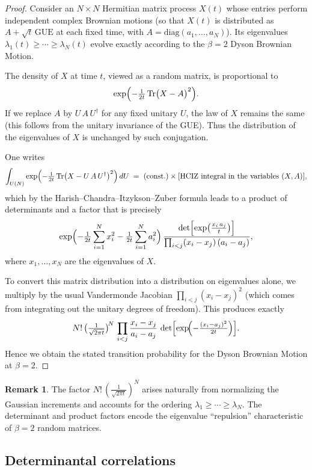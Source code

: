 \documentclass[letterpaper,11pt,oneside,reqno]{article}
\numberwithin{equation}{section}
\theoremstyle{definition}
\newtheorem{remark}[proposition]{Remark}
\begin{document}
\begin{proof}
Consider an \(N\times N\) Hermitian matrix process \(X(t)\) whose entries perform independent complex Brownian motions (so that \(X(t)\) is distributed as \(A + \sqrt{t}\,\mathrm{GUE}\) at each fixed time, with \(A=\mathrm{diag}(a_1,\dots,a_N)\)).  Its eigenvalues \(\lambda_1(t)\ge \cdots \ge \lambda_N(t)\) evolve exactly according to the \(\beta=2\) Dyson Brownian Motion.

The density of \(X\) at time \(t\), viewed as a random matrix, is proportional to
\[
\exp\Bigl(-\tfrac{1}{2t}\,\mathrm{Tr}\bigl(X-A\bigr)^2\Bigr).
\]
If we replace \(A\) by \(U\,A\,U^\dagger\) for any fixed unitary \(U\), the law of \(X\) remains the same (this follows from the unitary invariance of the GUE).  Thus the distribution of the eigenvalues of \(X\) is unchanged by such conjugation.

One writes
\[
\int_{U(N)} 
\exp\Bigl(-\tfrac{1}{2t}\,\mathrm{Tr}\bigl(X-U\,A\,U^\dagger\bigr)^2\Bigr)\,dU
\;=\;
\text{(const.)} \times 
\text{[HCIZ integral in the variables }(X,A)\text{]},
\]
which by the Harish--Chandra--Itzykson--Zuber formula leads to a product of determinants and a factor that is precisely
\[
\exp\Bigl(-\tfrac{1}{2t}\sum_{i=1}^N x_i^2 
- \tfrac{1}{2t}\sum_{i=1}^N a_i^2\Bigr)\,
\frac{\det\Bigl[\exp\bigl(\tfrac{x_i\,a_j}{t}\bigr)\Bigr]}{\prod_{i<j}(x_i - x_j)\,(a_i - a_j)},
\]
where \(x_1,\dots,x_N\) are the eigenvalues of \(X\).

To convert this matrix distribution into a distribution on eigenvalues alone, we multiply by the usual Vandermonde Jacobian
\(\prod_{i<j}(x_i - x_j)^2\)
(which comes from integrating out the unitary degrees of freedom).  This produces exactly
\[
N!\,\bigl(\tfrac{1}{\sqrt{2\pi t}}\bigr)^{\!N}\,
\prod_{i<j}\frac{x_i - x_j}{a_i - a_j}
\,\det\Bigl[\exp\!\Bigl(-\tfrac{(x_i - a_j)^2}{2t}\Bigr)\Bigr].
\]
Hence we obtain the stated transition probability for the Dyson Brownian Motion at \(\beta=2\).
\end{proof}

\begin{remark}
The factor \(N!\,(\tfrac{1}{\sqrt{2\pi t}})^N\) arises naturally from normalizing the Gaussian increments and accounts for the ordering \(\lambda_1\ge\cdots\ge \lambda_N\).  The determinant and product factors encode the eigenvalue ``repulsion'' characteristic of \(\beta=2\) random matrices.
\end{remark}


\subsection{Determinantal correlations}
\end{document}
